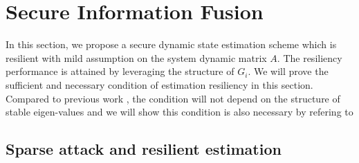 \documentclass[12pt]{article}
\newtheorem{proposition}{\textbf{Proposition}}
\begin{document}


\section{Secure Information Fusion}\label{sec:secure_info_fuse}
In this section, we propose a secure dynamic state estimation scheme which is resilient with mild assumption on the system dynamic matrix $A$.
The resiliency performance is attained by leveraging the structure of $G_i$.
We will prove the sufficient and necessary condition of estimation resiliency in this section.
Compared to previous work \cite{liuxinghua-IFAC}, the condition will not depend on the structure of stable eigen-values and we will show this condition is also necessary by refering to \cite{yori}

\subsection{Sparse attack and resilient estimation}
\end{document}
